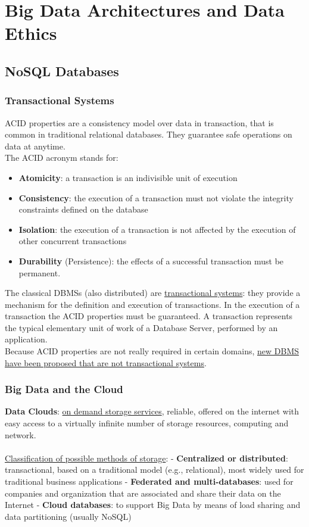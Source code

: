 \documentclass[10pt,a4paper]{article}
\newcommand{\nline}{\\~\\}
\begin{document}
\section{Big Data Architectures and Data Ethics}
\subsection{NoSQL Databases}
\subsubsection{Transactional Systems}
ACID properties are a consistency model over data in transaction, that is common in traditional relational databases. They guarantee safe operations on data at anytime. \\
The ACID acronym stands for:
\begin{itemize}
	\item \textbf{Atomicity}: a transaction is an indivisible unit of execution
	\item \textbf{Consistency}: the execution of a transaction must not violate the integrity constraints
defined on the database
	\item \textbf{Isolation}: the execution of a transaction is not affected by the execution of other
concurrent transactions
	\item \textbf{Durability} (Persistence): the effects of a successful transaction must be permanent.
\end{itemize}
The classical DBMSs (also distributed) are \uline{transactional systems}: they provide a mechanism for the definition and execution of transactions. In the execution of a transaction the ACID properties must be guaranteed. A transaction represents the typical elementary unit of work of a Database Server, performed by an application. \\
Because ACID properties are not really required in certain domains,
\uline{new DBMS have been proposed that are not transactional systems}. 
\subsubsection{Big Data and the Cloud}
\textbf{Data Clouds}: \uline{on demand storage services}, reliable, offered on the internet with easy access to a virtually infinite number of storage resources, computing and network. \nline
\uline{Classification of possible methods of storage}:
- \textbf{Centralized or distributed}: transactional, based on a traditional model (e.g., relational), most widely used for traditional business applications
- \textbf{Federated and multi-databases}: used for companies and organization that are associated and share their data on the Internet
- \textbf{Cloud databases}: to support Big Data by means of load sharing and data partitioning (usually NoSQL)
\end{document}

